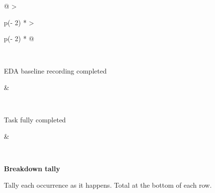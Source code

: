 \documentclass[
]{article}
\begin{document}
\begin{longtable}[]{@{}
  >{\raggedright\arraybackslash}p{(\columnwidth - 2\tabcolsep) * }
  >{\raggedright\arraybackslash}p{(\columnwidth - 2\tabcolsep) * }@{}}
\begin{minipage}[t]{\linewidth}
\end{minipage} \\
\begin{minipage}[t]{\linewidth}\raggedright
EDA baseline recording completed
\end{minipage} & \begin{minipage}[t]{\linewidth}\raggedright
\end{minipage} \\
\begin{minipage}[t]{\linewidth}\raggedright
Task fully completed
\end{minipage} & \begin{minipage}[t]{\linewidth}\raggedright
\end{minipage} \\
\midrule\noalign{}
\endhead
\bottomrule\noalign{}
\endlastfoot
\end{longtable}

\textbf{Breakdown tally}

Tally each occurrence as it happens. Total at the bottom of each row.
\end{document}
